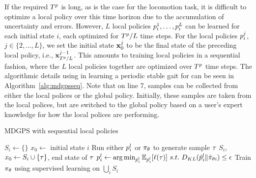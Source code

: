 If the required $T^{p}$ is long, as is the case for the \SB{} locomotion
task, it is difficult to optimize a local policy over this time horizon due to
the accumulation of uncertainty and errors. 
However, $L$ local policies $p_i^1,\ldots,p_i^L$ can be learned for each
initial state $i$, each optimized for $T^{p}/L$ time steps. For the
local policies $p_i^j$, $j\in\{2,\ldots,L\}$, we set the initial state
$\mathbf{x}_0^j$ to be the final state of the preceding local policy, i.e.,
$\mathbf{x}_{T^{p}/L}^{j-1}$. This amounts to training local policies in a
sequential fashion, where the $L$ local policies together are optimized over
$T^{p}$ time steps.
The algorithmic details using in learning a periodic stable gait for \SB{} can be seen in Algorithm~\ref{alg:mdgpsseq}.
Note that on line 7, samples can be collected from either the local polices or the global policy.
Initially, these samples are taken from the local polices, but are switched to the global policy based on a user's expert knowledge for how the local polices are performing.


\setlength{\textfloatsep}{12pt}
\begin{algorithm}[tb]
    \caption{MDGPS with sequential local policies}
    \label{alg:mdgpsseq}
    \begin{algorithmic}[1]
                \STATE $S_i\leftarrow\{\}$
                    \STATE $x_0\leftarrow$ initial state $i$
                        \STATE Run either $p_i^l$ or $\pi_{\theta}$ to
                        generate sample $\tau$
                        \STATE $S_i$, $x_0\leftarrow{S_i}\cup\{\tau\}$, end state of $\tau$
                    \ENDFOR
                \ENDFOR
                    \STATE $p_i^l\leftarrow\operatorname*{arg\,min}_{\hat{p}_i^l}\mathbb{E}_{\hat{p}_i^l}[\ell(\tau)]~s.t.~D_{KL}(\hat{p}_i^l\|\bar{\pi}_{\theta{i}})\leq\epsilon$
                \ENDFOR
            \ENDFOR
            \STATE Train $\pi_{\theta}$ using supervised learning on
            $\bigcup_iS_i$
        \ENDFOR
    \end{algorithmic}
\end{algorithm}

